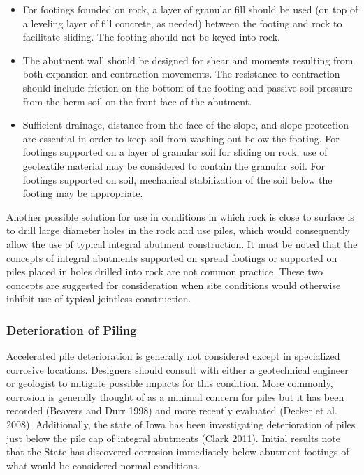 \begin{itemize}
  \item For footings founded on rock, a layer of granular fill should be used (on top of a leveling layer of fill concrete,  as needed) between the footing and rock to facilitate sliding. The footing should not be keyed into rock.
  \item The abutment wall should be designed for shear and moments resulting from both expansion and contraction  movements. The resistance to contraction should include friction on the bottom of the footing and passive  soil pressure from the berm soil on the front face of the abutment.
  \item Sufficient drainage, distance from the face of the slope, and slope protection are essential in order to keep soil  from washing out below the footing. For footings supported on a layer of granular soil for sliding on rock,
  use of geotextile material may be considered to contain the granular soil. For footings supported on soil,  mechanical stabilization of the soil below the footing may be appropriate.
\end{itemize}

Another possible solution for use in conditions in which rock is close to surface is to drill large diameter holes in
the rock and use piles, which would consequently allow the use of typical integral abutment construction. It must be
noted that the concepts of integral abutments supported on spread footings or supported on piles placed in holes
drilled into rock are not common practice. These two concepts are suggested for consideration when site conditions
would otherwise inhibit use of typical jointless construction.

\subsubsection{Deterioration of Piling}
Accelerated pile deterioration is generally not considered except in specialized corrosive locations. Designers
should consult with either a geotechnical engineer or geologist to mitigate possible impacts for this condition. More
commonly, corrosion is generally thought of as a minimal concern for piles but it has been recorded (Beavers and
Durr 1998) and more recently evaluated (Decker et al. 2008). Additionally, the state of Iowa has been investigating
deterioration of piles just below the pile cap of integral abutments (Clark 2011). Initial results note that the State has
discovered corrosion immediately below abutment footings of what would be considered normal conditions.

